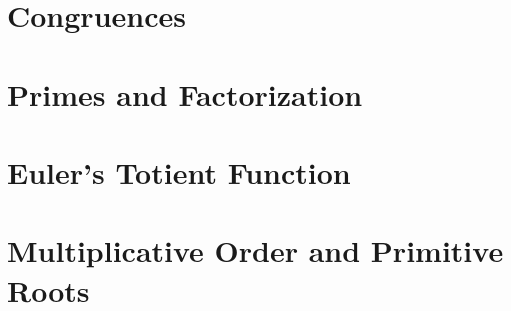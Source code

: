 




\section{Congruences}







\section{Primes and Factorization}





\section{Euler's Totient Function}





\section{Multiplicative Order and Primitive Roots}







